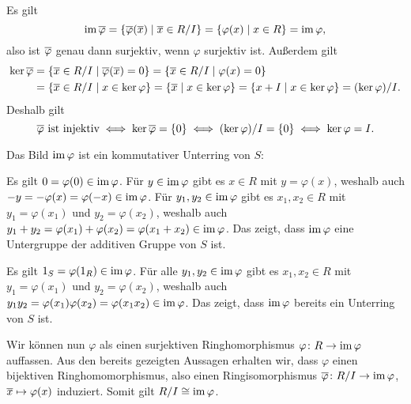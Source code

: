 Es gilt
\[
    \operatorname{im} \overline{\varphi}
  = \{ \overline{\varphi}(\overline{x}) \mid \overline{x} \in R/I \}
  = \{ \varphi(x) \mid x \in R \}
  = \operatorname{im} \varphi,
\]
also ist $\overline{\varphi}$ genau dann surjektiv, wenn $\varphi$ surjektiv ist.
Außerdem gilt
\begin{align*}
      \ker \overline{\varphi}
  &=  \{ \overline{x} \in R/I \mid \overline{\varphi}( \overline{x} ) = 0 \}
   =  \{ \overline{x} \in R/I \mid \varphi(x) = 0 \}
  \\
  &=  \{ \overline{x} \in R/I \mid x \in \ker \varphi \}
   =  \{ \overline{x} \mid x \in \ker \varphi \}
   =  \{ x + I \mid x \in \ker \varphi \}
   =  (\ker \varphi)/I.
\end{align*}
Deshalb gilt
\[
        \text{$\overline{\varphi}$ ist injektiv}
  \iff  \ker \overline{\varphi} = \{0\}
  \iff  (\ker \varphi)/I = \{0\}
  \iff  \ker \varphi = I.
\]

Das Bild $\operatorname{im} \varphi$ ist ein kommutativer Unterring von $S$:

Es gilt $0 = \varphi(0) \in \operatorname{im} \varphi$.
Für $y \in \operatorname{im} \varphi$ gibt es $x \in R$ mit $y = \varphi(x)$, weshalb auch $-y = -\varphi(x) = \varphi(-x) \in \operatorname{im} \varphi$.
Für $y_1, y_2 \in \operatorname{im} \varphi$ gibt es $x_1, x_2 \in R$ mit $y_1 = \varphi(x_1)$ und $y_2 = \varphi(x_2)$, weshalb auch $y_1 + y_2 = \varphi(x_1) + \varphi(x_2) = \varphi(x_1 + x_2) \in \operatorname{im} \varphi$.
Das zeigt, dass $\operatorname{im} \varphi$ eine Untergruppe der additiven Gruppe von $S$ ist.

Es gilt $1_S = \varphi(1_R) \in \operatorname{im} \varphi$.
Für alle $y_1, y_2 \in \operatorname{im} \varphi$ gibt es $x_1, x_2 \in R$ mit $y_1 = \varphi(x_1)$ und $y_2 = \varphi(x_2)$, weshalb auch $y_1 y_2 = \varphi(x_1) \varphi(x_2) = \varphi(x_1 x_2) \in \operatorname{im} \varphi$.
Das zeigt, dass $\operatorname{im} \varphi$ bereits ein Unterring von $S$ ist.

Wir können nun $\varphi$ als einen surjektiven Ringhomorphismus $\varphi \colon R \to \operatorname{im} \varphi$ auffassen.
Aus den bereits gezeigten Aussagen erhalten wir, dass $\varphi$ einen bijektiven Ringhomomorphismus, also einen Ringisomorphismus $\overline{\varphi} \colon R/I \to \operatorname{im} \varphi$, $\overline{x} \mapsto \varphi(x)$ induziert.
Somit gilt $R/I \cong \operatorname{im} \varphi$.


